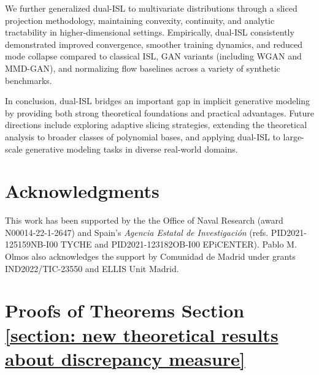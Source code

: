 \documentclass{article}
\makeatletter
\let\saved@addcontentsline\addcontentsline
\newcommand\restoreTOCentries{%
    \let\addcontentsline\saved@addcontentsline%
  }
\makeatother
\begin{document}
We further generalized dual-ISL to multivariate distributions through a sliced projection methodology, maintaining convexity, continuity, and analytic tractability in higher-dimensional settings. Empirically, dual-ISL consistently demonstrated improved convergence, smoother training dynamics, and reduced mode collapse compared to classical ISL, GAN variants (including WGAN and MMD-GAN), and normalizing flow baselines across a variety of synthetic benchmarks.

In conclusion, dual-ISL bridges an important gap in implicit generative modeling by providing both strong theoretical foundations and practical advantages. Future directions include exploring adaptive slicing strategies, extending the theoretical analysis to broader classes of polynomial bases, and applying dual-ISL to large-scale generative modeling tasks in diverse real-world domains.

\section*{Acknowledgments}

This work has been supported by the the Office of Naval Research (award N00014-22-1-2647) and Spain's {\em Agencia Estatal de Investigaci\'on} (refs. PID2021-125159NB-I00 TYCHE and PID2021-123182OB-I00 EPiCENTER). Pablo M. Olmos also acknowledges the support by Comunidad de Madrid under grants IND2022/TIC-23550 and ELLIS Unit Madrid.



%
%
\printbibliography




\newpage

\restoreTOCentries

\appendix


\tableofcontents
\vfill
\newpage

\section{Proofs of Theorems Section \ref{section: new theoretical results about discrepancy measure}} \label{appendix: proofs of new theoretical results about discrepancy measure}
\end{document}
